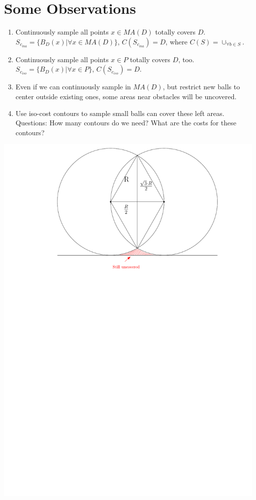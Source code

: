 \documentclass[12pt]{article}
\begin{document}
  \section{Some Observations}
  \begin{enumerate}
  	\item Continuously sample all points $x \in MA(D)$ totally covers $D$.  $S_{c_{ma}} = \{B_D(x) | \forall x \in MA(D)\}$, $C(S_{c_{ma}}) = D$, where $C(S) = \cup_{\forall b \in S}$.
  	
  	\item Continuously sample all points $x \in P$ totally covers $D$, too.  $S_{c_{iso}} = \{B_D(x) | \forall x \in P\}$, $C(S_{c_{iso}}) = D$.
  	
  	\item Even if we can continuously sample in $MA(D)$, but restrict new balls to center outside existing ones, some areas near obstacles will be uncovered. 
    
    \item Use iso-cost contours to sample small balls can cover these left areas. Questions: How many contours do we need? What are the costs for these contours?
  	
  \end{enumerate}
  
  \includegraphics[scale=0.8]{./sampling2d/2discs.pdf}
  
\end{document}
